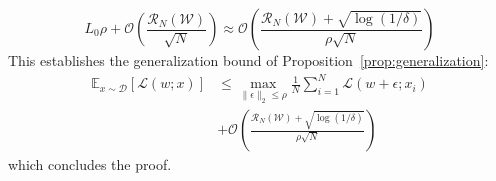 \documentclass{article}
\theoremstyle{plain}
\theoremstyle{definition}
\theoremstyle{remark}
\begin{document}
\begin{equation}
  L_0 \rho + \mathcal{O}\left(\frac{\mathcal{R}_N(\mathcal{W})}{\sqrt{N}}\right) \approx \mathcal{O}\left( \frac{\mathcal{R}_N(\mathcal{W}) + \sqrt{\log(1/\delta)}}{\rho \sqrt{N}} \right)
\end{equation}
This establishes the generalization bound of Proposition~\ref{prop:generalization}:
\begin{equation}
\begin{split}
  \mathbb{E}_{x \sim \mathcal{D}} [\mathcal{L}(w; x)] &\le \max_{\|\epsilon\|_2 \le \rho} \frac{1}{N} \sum_{i=1}^N \mathcal{L}(w + \epsilon; x_i) \\
  &+ \mathcal{O}\left( \frac{\mathcal{R}_N(\mathcal{W}) + \sqrt{\log(1/\delta)}}{\rho \sqrt{N}} \right)
\end{split}
\end{equation}
which concludes the proof.
\end{document}
